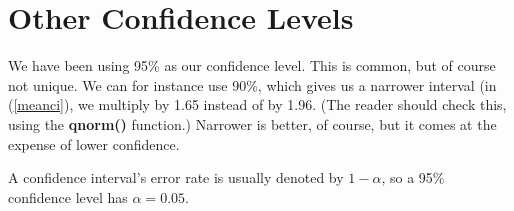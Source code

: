 % 
% 
% 
% 
% 
% 

\section{Other Confidence Levels}

We have been using 95\% as our confidence level.  This is common, but of
course not unique.  We can for instance use 90\%, which gives us a
narrower interval (in (\ref{meanci}), we multiply by 1.65 instead of by
1.96.  (The reader should check this, using the {\bf qnorm()} function.)
Narrower is better, of course, but it comes at the expense of lower
confidence.

A confidence interval's error rate is usually denoted by $1-\alpha$, so
a 95\% confidence level has $\alpha = 0.05$.

